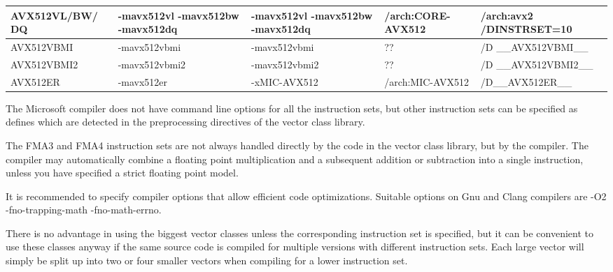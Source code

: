 \documentclass[vcl_manual.tex]{subfiles}
\begin{document}
\begin {table}[h]
\begin{tabular}{|p{26mm}|p{28mm}|p{28mm}|p{28mm}|p{28mm}|}
AVX512VL/BW/ DQ & -mavx512vl -mavx512bw -mavx512dq & -mavx512vl -mavx512bw -mavx512dq & /arch:CORE-AVX512 & /arch:avx2 /DINSTRSET=10 \\ \hline
AVX512VBMI & -mavx512vbmi & -mavx512vbmi & ?? & /D \_\_AVX512VBMI\_\_ \\ \hline
AVX512VBMI2 & -mavx512vbmi2 & -mavx512vbmi2 & ?? & /D \_\_AVX512VBMI2\_\_ \\ \hline
AVX512ER & -mavx512er & -xMIC-AVX512 & /arch:MIC-AVX512 & /D\_\_AVX512ER\_\_ \\ \hline

\end{tabular}
\end{table}


The Microsoft compiler does not have command line options for all the instruction sets, but other instruction sets can be specified as defines which are detected in the preprocessing directives of the vector class library.

The FMA3 and FMA4 instruction sets are not always handled directly by the code in the vector class library, but by the compiler. The compiler may automatically combine a floating point multiplication and a subsequent addition or subtraction into a single instruction, unless you have specified a strict floating point model.

It is recommended to specify compiler options that allow efficient code optimizations. Suitable options on Gnu and Clang compilers are
-O2 -fno-trapping-math -fno-math-errno.

There is no advantage in using the biggest vector classes unless the corresponding instruction set is specified, but it can be convenient to use these classes anyway if the same source code is compiled for multiple versions with different instruction sets. Each large vector will simply be split up into two or four smaller vectors when compiling for a lower instruction set.
\end{document}
